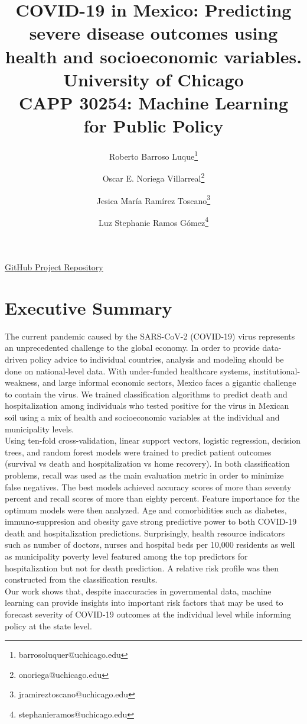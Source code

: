 \documentclass[hidelinks,10pt]{article}
\title{COVID-19 in Mexico: Predicting severe disease outcomes using health and socioeconomic variables.\\
\large University of Chicago\\
CAPP 30254: Machine Learning for Public Policy}
\author{Roberto Barroso Luque\footnote{barrosoluquer@uchicago.edu} \and Oscar E. Noriega Villarreal\footnote{onoriega@uchicago.edu} \and Jesica María Ramírez Toscano\footnote{jramireztoscano@uchicago.edu}\and Luz Stephanie Ramos Gómez\footnote{stephanieramos@uchicago.edu}}
\begin{document}
	\maketitle
		\begin{center}
		\faGithub\href{https://github.com/ml-project-2020}{ GitHub Project Repository}
	\end{center}
	


	
	\pagebreak
	
			\section{Executive Summary}
		The current pandemic caused by the SARS-CoV-2 (COVID-19) virus represents an unprecedented challenge to the global economy. In order to provide data-driven policy advice to individual countries, analysis and modeling should be done on national-level data. With under-funded healthcare systems, institutional-weakness, and large informal economic sectors, Mexico faces a gigantic challenge to contain the virus. We trained classification algorithms to predict death and hospitalization among individuals who tested positive for the virus in Mexican soil using a mix of health and socioeconomic variables at the individual and municipality levels. \\Using ten-fold cross-validation, linear support vectors, logistic regression, decision trees, and random forest models were trained to predict patient outcomes (survival vs death and hospitalization vs home recovery). In both classification problems, recall was used as the main evaluation metric in order to minimize false negatives. The best models achieved accuracy scores of more than seventy percent and recall scores of more than eighty percent. Feature importance for the optimum models were then analyzed. Age and comorbidities such as diabetes, immuno-suppresion and obesity gave strong predictive power to both COVID-19 death and hospitalization predictions. Surprisingly, health resource indicators such as number of doctors, nurses and hospital beds per 10,000 residents as well as municipality poverty level featured among the top predictors for hospitalization but not for death prediction. A relative risk profile was then constructed from the classification results. \\Our work shows that, despite inaccuracies in governmental data, machine learning can provide insights into important risk factors that may be used to forecast severity of COVID-19 outcomes at the individual level while informing policy at the state level. 
		
\end{document}
